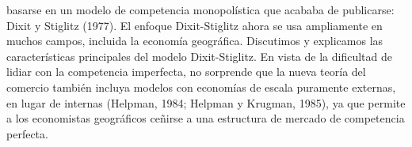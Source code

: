 basarse en un modelo de competencia monopolística que acababa de publicarse: Dixit y Stiglitz (1977). El enfoque Dixit-Stiglitz ahora se usa ampliamente en muchos campos, incluida la economía geográfica. Discutimos y explicamos las características principales del modelo Dixit-Stiglitz. En vista de la dificultad de lidiar con la competencia imperfecta, no sorprende que la nueva teoría del comercio también incluya modelos con economías de escala puramente externas, en lugar de internas (Helpman, 1984; Helpman y Krugman, 1985), ya que permite a los economistas geográficos ceñirse a una estructura de mercado de competencia perfecta.  


